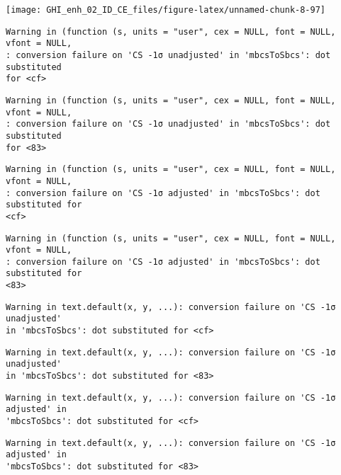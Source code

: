 \documentclass[
  10pt,
  a4paper,oneside]{article}
\begin{document}
\begin{center}\texttt{[image: GHI\_enh\_02\_ID\_CE\_files/figure-latex/unnamed-chunk-8-97]} \end{center}

\begin{verbatim}
Warning in (function (s, units = "user", cex = NULL, font = NULL, vfont = NULL,
: conversion failure on 'CS -1σ unadjusted' in 'mbcsToSbcs': dot substituted
for <cf>
\end{verbatim}

\begin{verbatim}
Warning in (function (s, units = "user", cex = NULL, font = NULL, vfont = NULL,
: conversion failure on 'CS -1σ unadjusted' in 'mbcsToSbcs': dot substituted
for <83>
\end{verbatim}

\begin{verbatim}
Warning in (function (s, units = "user", cex = NULL, font = NULL, vfont = NULL,
: conversion failure on 'CS -1σ adjusted' in 'mbcsToSbcs': dot substituted for
<cf>
\end{verbatim}

\begin{verbatim}
Warning in (function (s, units = "user", cex = NULL, font = NULL, vfont = NULL,
: conversion failure on 'CS -1σ adjusted' in 'mbcsToSbcs': dot substituted for
<83>
\end{verbatim}

\begin{verbatim}
Warning in text.default(x, y, ...): conversion failure on 'CS -1σ unadjusted'
in 'mbcsToSbcs': dot substituted for <cf>
\end{verbatim}

\begin{verbatim}
Warning in text.default(x, y, ...): conversion failure on 'CS -1σ unadjusted'
in 'mbcsToSbcs': dot substituted for <83>
\end{verbatim}

\begin{verbatim}
Warning in text.default(x, y, ...): conversion failure on 'CS -1σ adjusted' in
'mbcsToSbcs': dot substituted for <cf>
\end{verbatim}

\begin{verbatim}
Warning in text.default(x, y, ...): conversion failure on 'CS -1σ adjusted' in
'mbcsToSbcs': dot substituted for <83>
\end{verbatim}
\end{document}
